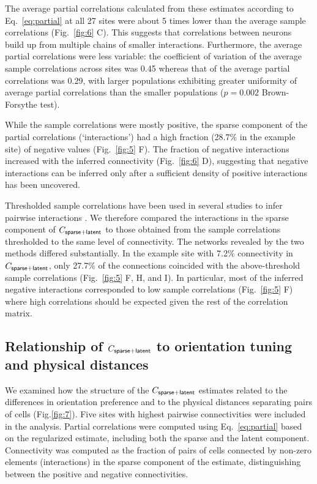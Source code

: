 The average partial correlations calculated from these estimates according to Eq.~\ref{eq:partial} at all 27 sites were about 5 times lower than the average sample correlations (Fig.~\ref{fig:6} C). This suggests that correlations between neurons build up from multiple chains of smaller interactions. Furthermore, the average partial correlations were less variable: the coefficient of variation of the average sample correlations across sites was 0.45 whereas that of the average partial correlations was 0.29, with larger populations exhibiting greater uniformity of average partial correlations than the smaller populations ($p=0.002$ Brown-Forsythe test).

While the sample correlations were mostly positive, the sparse component of the partial correlations (`interactions') had a high fraction (28.7\% in the example site) of negative values (Fig.~\ref{fig:5} F). The fraction of negative interactions increased with the inferred connectivity (Fig.~\ref{fig:6} D), suggesting that negative interactions can be inferred only after a sufficient density of positive interactions has been uncovered.

Thresholded sample correlations have been used in several studies to infer pairwise interactions \citep{Golshani:2009, Feldt:2011, Malmersjo:2013, Sadovsky:2014}.  We therefore compared the interactions in the sparse component of $C_{\sf sparse+latent}$ to those obtained from the sample correlations thresholded to the same level of connectivity. The networks revealed by the two methods differed substantially. In the example site with 7.2\% connectivity in $C_{\sf sparse+latent}$, only 27.7\% of the connections coincided with the above-threshold sample correlations (Fig.~\ref{fig:5} F, H, and I). In particular, most of the inferred negative interactions corresponded to low sample correlations (Fig.~\ref{fig:5} F) where high correlations should be expected given the rest of the correlation matrix.

\subsection*{Relationship of $C_{\sf sparse+latent}$ to orientation tuning and physical distances}


We examined how the structure of the $C_{\sf sparse+latent}$ estimates related to the differences in orientation preference and to the physical distances separating pairs of cells (Fig.\;\ref{fig:7}).  Five sites with highest pairwise connectivities were included in the analysis. Partial correlations were computed using Eq.~\ref{eq:partial} based on the regularized estimate, including both the sparse and the latent component. Connectivity was computed as the fraction of pairs of cells connected by non-zero elements (interactions) in the sparse component of the estimate, distinguishing between the positive and negative connectivities.


